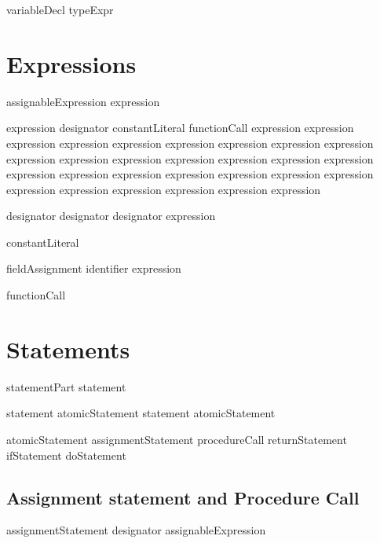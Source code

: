 \bgrm
variableDecl \Derive
   \trm{:} typeExpr 
\egrm

\section{Expressions}
\bgrm
assignableExpression \Derive
     expression
\alt {} 
\egrm

\bgrm
expression \Derive
     designator        
\alt constantLiteral   
\alt functionCall                
\alt \trm{-} expression 
\alt expression \trm{*} expression
\alt expression \trm{/} expression
\alt expression \trm{+} expression
\alt expression \trm{-} expression 
\alt expression  expression
\alt expression \trm{=} expression
\alt expression \trm{/=} expression
\alt expression \trm{<} expression
\alt expression \trm{<=} expression
\alt expression \trm{>} expression
\alt expression \trm{>=} expression
\alt {} expression
\alt expression  expression
\alt expression  expression
\alt \trm{(} expression \trm{)}
\egrm

\bgrm
designator \Derive
\alt designator   
\alt designator \trm{[} expression \trm{]}
\egrm

\bgrm
constantLiteral \Derive
     \trm{\unitval}            
\alt {}
\alt {}
\alt \numb         
\egrm

\bgrm
fieldAssignment \Derive
  identifier \trm{=} expression
\egrm

\bgrm
functionCall \Derive
   \trm{(}  \trm{)}
\egrm

\section{Statements}
\bgrm
statementPart \Derive
   statement   
\egrm

\bgrm                               
statement \Derive
  atomicStatement \trm{;} statement              
\alt atomicStatement         
\egrm

\bgrm
atomicStatement \Derive
\alt assignmentStatement      
\alt procedureCall         
\alt returnStatement       
\alt ifStatement           
\alt doStatement           
\egrm

\subsection{Assignment statement and Procedure Call}
\bgrm
assignmentStatement \Derive
  designator \trm{:=} assignableExpression
\egrm

